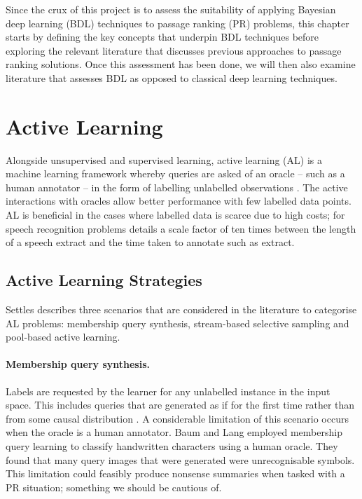 Since the crux of this project is to assess the suitability of applying Bayesian deep learning (BDL) techniques to passage ranking (PR) problems, this chapter starts by defining the key concepts that underpin BDL techniques before exploring the relevant literature that discusses previous approaches to passage ranking solutions. Once this assessment has been done, we will then also examine literature that assesses BDL as opposed to classical deep learning techniques.
		
		
\section{Active Learning}
\label{chap:literaturereview:active}

Alongside unsupervised and supervised learning, active learning (AL) is a machine learning framework whereby queries are asked of an oracle – such as a human annotator – in the form of labelling unlabelled observations \cite{Settles09}. The active interactions with oracles allow better performance with few labelled data points. AL is beneficial in the cases where labelled data is scarce due to high costs; for speech recognition problems \cite{Zhu05} details a scale factor of ten times between the length of a speech extract and the time taken to annotate such as extract.
		
\subsection{Active Learning Strategies}
\label{chap:literaturereview:active:strategies}

Settles \cite{Settles09} describes three scenarios that are considered in the literature to categorise AL problems: membership query synthesis, stream-based selective sampling and pool-based active learning.

\paragraph{Membership query synthesis.}  Labels are requested by the learner for any unlabelled instance in the input space. This includes queries that are generated as if for the first time rather than from some causal distribution \cite{Angluin88}. A considerable limitation of this scenario occurs when the oracle is a human annotator. Baum and Lang \cite{Baum92} employed membership query learning to classify handwritten characters using a human oracle. They found that many query images that were generated were unrecognisable symbols. This limitation could feasibly produce nonsense summaries when tasked with a PR situation; something we should be cautious of.

